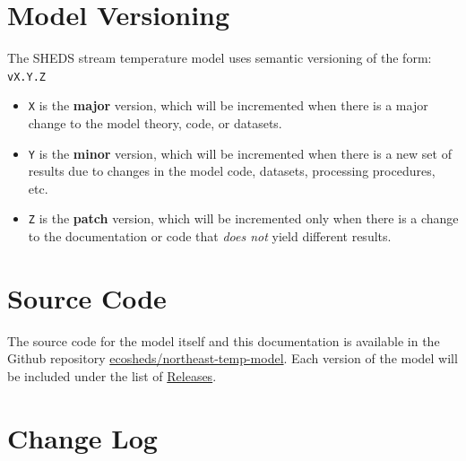 \documentclass[
]{book}
\providecommand{\tightlist}{%
  \setlength{\itemsep}{0pt}\setlength{\parskip}{0pt}}
\begin{document}
\section{Model Versioning}\label{model-versioning}

The SHEDS stream temperature model uses semantic versioning of the form: \texttt{vX.Y.Z}

\begin{itemize}
\tightlist
\item
  \texttt{X} is the \textbf{major} version, which will be incremented when there is a major change to the model theory, code, or datasets.
\item
  \texttt{Y} is the \textbf{minor} version, which will be incremented when there is a new set of results due to changes in the model code, datasets, processing procedures, etc.
\item
  \texttt{Z} is the \textbf{patch} version, which will be incremented only when there is a change to the documentation or code that \emph{does not} yield different results.
\end{itemize}

\section{Source Code}\label{source-code}

The source code for the model itself and this documentation is available in the Github repository \href{https://github.com/ecosheds/northeast-temp-model}{ecosheds/northeast-temp-model}. Each version of the model will be included under the list of \href{https://github.com/ecosheds/northeast-temp-model/releases}{Releases}.

\section{Change Log}\label{change-log}
\end{document}
